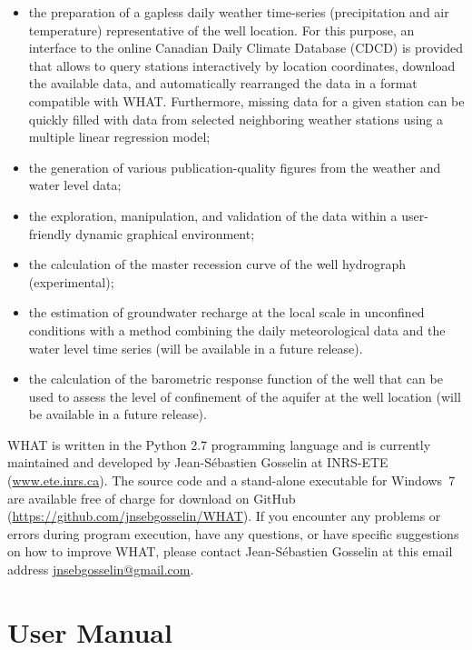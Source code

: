 \documentclass[12pt, letterpaper, fleqn]{report}
\begin{document}
\begin{itemize}
\item{the preparation of a gapless daily weather time-series (precipitation and air temperature) representative of the well location. For this purpose, an interface to the online Canadian Daily Climate Database (CDCD) is provided that allows to query stations interactively by location coordinates, download the available data, and automatically rearranged the data in a format compatible with WHAT. Furthermore, missing data for a given station can be quickly filled with data from selected neighboring weather stations using a multiple linear regression model;}
\item{the generation of various publication-quality figures from the weather and water level data;}
\item{the exploration, manipulation, and validation of the data within a user-friendly dynamic graphical environment;}
\item{the calculation of the master recession curve of the well hydrograph (experimental);}
\item{the estimation of groundwater recharge at the local scale in unconfined conditions with a method combining the daily meteorological data and the water level time series (will be available in a future release).}
\item{the calculation of the barometric response function of the well that can be used to assess the level of confinement of the aquifer at the well location (will be available in a future release).}
\end{itemize}

WHAT is written in the Python 2.7 programming language and is currently maintained and developed by Jean-Sébastien Gosselin at INRS-ETE (\url{www.ete.inrs.ca}). The source code and a stand-alone executable for Windows 7 are available free of charge for download on GitHub (\url{https://github.com/jnsebgosselin/WHAT}). If you encounter any problems or errors during program execution, have any questions, or have specific suggestions on how to improve WHAT, please contact Jean-Sébastien Gosselin at this email address \href{mailto:jnsebgosselin@gmail.com}{jnsebgosselin@gmail.com}.

\tableofcontents

\listoffigures

\chapter{User Manual}
\end{document}
